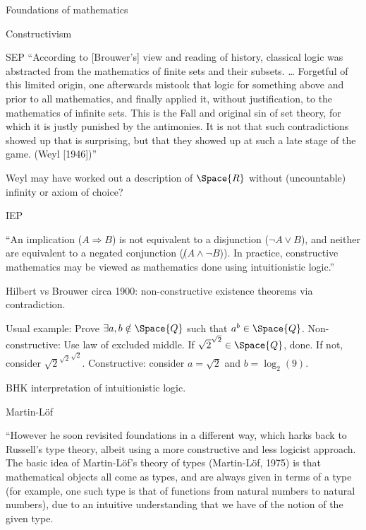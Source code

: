 \begin{plSection}{Foundations of mathematics}
\begin{plSection}{Constructivism}
\begin{plSection}{SEP}
``According to [Brouwer’s] view and reading of history, 
classical logic was abstracted 
from the mathematics of finite sets and their subsets. \ldots 
Forgetful of this limited origin, 
one afterwards mistook that logic 
for something above and prior to all mathematics, 
and finally applied it, without justification, 
to the mathematics of infinite sets. 
This is the Fall and original sin of set theory, 
for which it is justly punished by the antimonies. 
It is not that such contradictions showed up that is surprising,
 but that they showed up at such a late stage of the game. 
 (Weyl [1946])''
 
Weyl may have worked out a description of
$\Space{R}$ without (uncountable) infinity or
axiom of choice?

\end{plSection}%
\begin{plSection}{IEP}
\label{sec:Constructivism_IEP}
\cite{iep:ConstructiveMathematics}

``An implication ($A \Rightarrow B$) is not equivalent 
to a disjunction ($\lnot A \vee B$), 
and neither are equivalent to a negated conjunction 
($\not (A \wedge \lnot B$)). 
In practice, constructive mathematics may be viewed 
as mathematics done using intuitionistic 
logic.''\cite{iep:ConstructiveMathematics}

Hilbert vs Brouwer circa 1900: 
non-constructive existence theorems via contradiction.

Usual example: Prove $\exists a,b \notin \Space{Q}$
such that $a^b \in \Space{Q}$. \hfill\break
Non-constructive: Use law of excluded middle.
If $\sqrt{2}^{\sqrt{2}} \in \Space{Q}$, done.
If not, consider ${\sqrt{2}^{\sqrt{2}}}^{\sqrt{2}}$.
\hfill\break
Constructive: consider $a=\sqrt{2}$ and $b=\log_2(9)$.

BHK interpretation of intuitionistic 
logic\cite{wiki:BrouwerHeytingKolmogorovInterpretation}.

\end{plSection}%
\begin{plSection}{Martin-L\"{o}f}
\label{sec:Martin_Lof_IEP}

``However he soon revisited foundations in a different way, 
which harks back to Russell's type theory, 
albeit using a more constructive and less logicist approach. 
The basic idea of Martin-Löf's theory of types (Martin-Löf, 1975) 
is
that mathematical objects all come as types, 
and are always given in terms of a
type (for example, one such type is that of functions 
from natural numbers to
natural numbers), due to an intuitive understanding 
that we have of the notion
of the given type.


\end{plSection}
\end{plSection}
\end{plSection}
